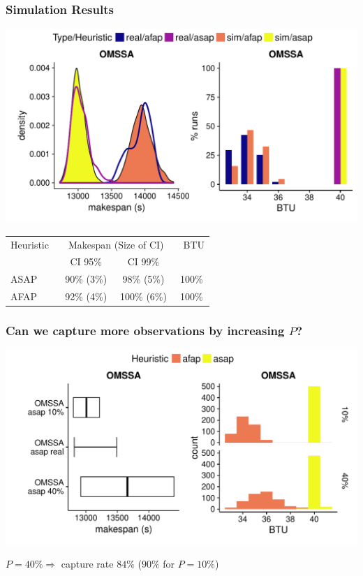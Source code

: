 \documentclass{beamer}
\begin{document}
\begin{frame}
	\frametitle{Simulation Results}
	\begin{center}
	\includegraphics[height=0.6\textheight]{gfx/fit.pdf}\\
	{\small
	\begin{tabular}{lccc}
		\toprule
		Heuristic~&\multicolumn{2}{c}{~Makespan (Size of
		CI)~}&~BTU\\
		 & CI 95\% & CI 99\% &\\
		\midrule
		ASAP& 90\% (3\%)& 98\% (5\%)& 100\%\\
		AFAP& 92\% (4\%)& 100\% (6\%)& 100\%\\
		\bottomrule
	\end{tabular}
	}
	\end{center}
\end{frame}

\begin{frame}
	\frametitle{Can we capture more observations by increasing $P$?}
	\includegraphics[width=\textwidth]{gfx/int.pdf}\\
	\pause
	\begin{center}
		$P{=}40\% \Rightarrow$ capture rate $84\%$ ($90\%$ for $P{=}10\%$)
\end{center}
\end{frame}
\end{document}
